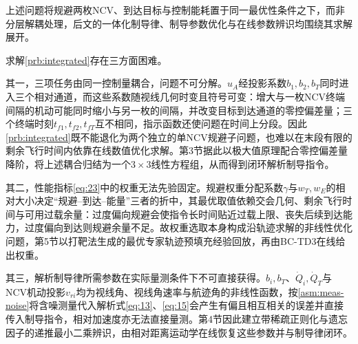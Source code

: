 上述问题将规避两枚NCV、到达目标与控制能耗置于同一最优性条件之下，而非分层解耦处理，后文的一体化制导律、制导参数优化与在线参数辨识均围绕其求解展开。

求解\cref{prb:integrated}存在三方面困难。

其一，三项任务由同一控制量耦合，问题不可分解。${u_A}$经投影系数${b_1},{b_2},{b_T}$同时进入三个相对通道，而这些系数随视线几何时变且符号可变：增大与一枚NCV终端间隔的机动可能同时缩小与另一枚的间隔，并改变目标到达通道的零控偏差量；三个终端时刻${t_{f1}},{t_{f2}},{t_{fT}}$互不相同，指示函数还使问题在时间上分段。因此\cref{prb:integrated}既不能退化为两个独立的单NCV规避子问题，也难以在末段有限的剩余飞行时间内依靠在线数值优化求解。第3节据此以极大值原理配合零控偏差量降阶，将上述耦合归结为一个$3 \times 3$线性方程组，从而得到闭环解析制导指令。

其二，性能指标\eqref{eq:23}中的权重无法先验固定。规避权重分配系数$\gamma $与${w_T},{w_E}$的相对大小决定“规避--到达--能量”三者的折中，其最优取值依赖交会几何、剩余飞行时间与可用过载余量：过度偏向规避会使指令长时间贴近过载上限、丧失后续到达能力，过度偏向到达则规避余量不足。故权重选取本身构成沿轨迹求解的非线性优化问题，第5节以打靶法生成的最优专家轨迹预填充经验回放，再由BC-TD3在线给出权重。

其三，解析制导律所需参数在实际量测条件下不可直接获得。${b_i},{b_T}$、${\dot Q_i},{\dot Q_T}$与NCV机动投影${v_{ri}}$均为视线角、视线角速率与航迹角的非线性函数，按\cref{asm:meas-noise}将含噪测量代入解析式\eqref{eq:13}、\eqref{eq:15}会产生有偏且相互相关的误差并直接传入制导指令，相对加速度亦无法直接量测。第4节因此建立带稀疏正则化与遗忘因子的递推最小二乘辨识，由相对距离运动学在线恢复这些参数并与制导律闭环。
